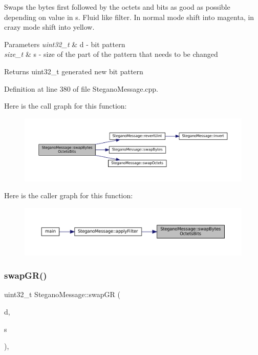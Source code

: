 Swaps the bytes first followed by the octets and bits as good as possible depending on value in s. Fluid like filter. In normal mode shift into magenta, in crazy mode shift into yellow. 


\begin{DoxyParams}{Parameters}
{\em uint32\+\_\+t} & d -\/ bit pattern \\
\hline
{\em size\+\_\+t} & s -\/ size of the part of the pattern that needs to be changed \\
\hline
\end{DoxyParams}
\begin{DoxyReturn}{Returns}
uint32\+\_\+t generated new bit pattern 
\end{DoxyReturn}


Definition at line 380 of file Stegano\+Message.\+cpp.

Here is the call graph for this function\+:\nopagebreak
\begin{figure}[H]
\begin{center}
\leavevmode
\includegraphics[width=350pt]{classSteganoMessage_ab17fa1a4dc587ae268e400913cc5f0c8_cgraph}
\end{center}
\end{figure}
Here is the caller graph for this function\+:\nopagebreak
\begin{figure}[H]
\begin{center}
\leavevmode
\includegraphics[width=350pt]{classSteganoMessage_ab17fa1a4dc587ae268e400913cc5f0c8_icgraph}
\end{center}
\end{figure}
\mbox{\label{classSteganoMessage_a7e29a46073f2ef9c6e44bb1d46ad534f}} 
\subsubsection{\texorpdfstring{swapGR()}{swapGR()}}
{\footnotesize\ttfamily uint32\+\_\+t Stegano\+Message\+::swap\+GR (\begin{DoxyParamCaption}\item[{uint32\+\_\+t}]{d,  }\item[{size\+\_\+t}]{s }\end{DoxyParamCaption})\hspace{0.3cm}{\ttfamily [static]}, {\ttfamily [private]}}



